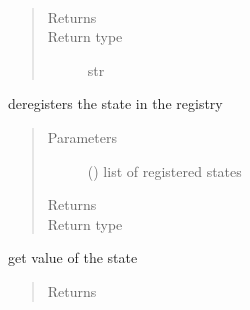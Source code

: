 \documentclass[letterpaper,10pt,english]{sphinxmanual}
\begin{document}
\begin{fulllineitems}
\begin{quote}
\begin{description}
\begin{itemize}
\end{itemize}

\end{description}\end{quote}

\begin{fulllineitems}
\label{\detokenize{Reference:salabim.State.base_name}}~\begin{quote}\begin{description}
\item[{Returns}] \leavevmode
{}

\item[{Return type}] \leavevmode
str

\end{description}\end{quote}

\end{fulllineitems}


\begin{fulllineitems}
\label{\detokenize{Reference:salabim.State.deregister}}
deregisters the state in the registry
\begin{quote}\begin{description}
\item[{Parameters}] \leavevmode
{} () \textendash{} list of registered states

\item[{Returns}] \leavevmode
{}

\item[{Return type}] \leavevmode
{\hyperref[\detokenize{Reference:salabim.State}]{}}

\end{description}\end{quote}

\end{fulllineitems}


\begin{fulllineitems}
\label{\detokenize{Reference:salabim.State.get}}
get value of the state
\begin{quote}\begin{description}
\item[{Returns}] \leavevmode


\end{description}
\end{quote}
\end{fulllineitems}
\end{fulllineitems}
\end{document}

